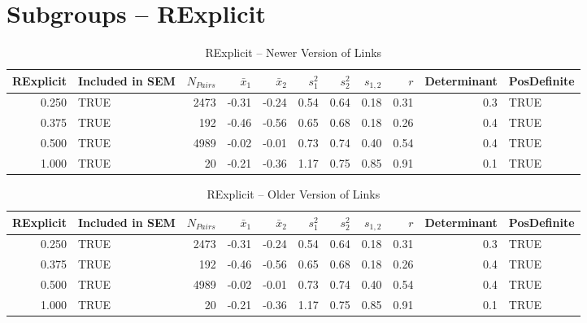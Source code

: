 \documentclass{article}\usepackage[]{graphicx}\usepackage[]{color}
\begin{document}
\section{Subgroups --  RExplicit }%
\begin{table}[ht]
\centering
\begin{tabular}{rlrrrrrrrrl}
  \hline
RExplicit & Included in SEM & $N_{Pairs}$ & $\bar{x}_1$ & $\bar{x}_2$ & $s_1^2$ & $s_2^2$ & $s_{1,2}$ & $r$ & Determinant & PosDefinite \\ 
  \hline
0.250 & TRUE & 2473 & -0.31 & -0.24 & 0.54 & 0.64 & 0.18 & 0.31 & 0.3 & TRUE \\ 
  0.375 & TRUE & 192 & -0.46 & -0.56 & 0.65 & 0.68 & 0.18 & 0.26 & 0.4 & TRUE \\ 
  0.500 & TRUE & 4989 & -0.02 & -0.01 & 0.73 & 0.74 & 0.40 & 0.54 & 0.4 & TRUE \\ 
  1.000 & TRUE & 20 & -0.21 & -0.36 & 1.17 & 0.75 & 0.85 & 0.91 & 0.1 & TRUE \\ 
   \hline
\end{tabular}
\caption{RExplicit -- Newer Version of Links} 
\end{table}
\begin{table}[ht]
\centering
\begin{tabular}{rlrrrrrrrrl}
  \hline
RExplicit & Included in SEM & $N_{Pairs}$ & $\bar{x}_1$ & $\bar{x}_2$ & $s_1^2$ & $s_2^2$ & $s_{1,2}$ & $r$ & Determinant & PosDefinite \\ 
  \hline
0.250 & TRUE & 2473 & -0.31 & -0.24 & 0.54 & 0.64 & 0.18 & 0.31 & 0.3 & TRUE \\ 
  0.375 & TRUE & 192 & -0.46 & -0.56 & 0.65 & 0.68 & 0.18 & 0.26 & 0.4 & TRUE \\ 
  0.500 & TRUE & 4989 & -0.02 & -0.01 & 0.73 & 0.74 & 0.40 & 0.54 & 0.4 & TRUE \\ 
  1.000 & TRUE & 20 & -0.21 & -0.36 & 1.17 & 0.75 & 0.85 & 0.91 & 0.1 & TRUE \\ 
   \hline
\end{tabular}
\caption{RExplicit -- Older Version of Links} 
\end{table}
\newpage 
\end{document}
